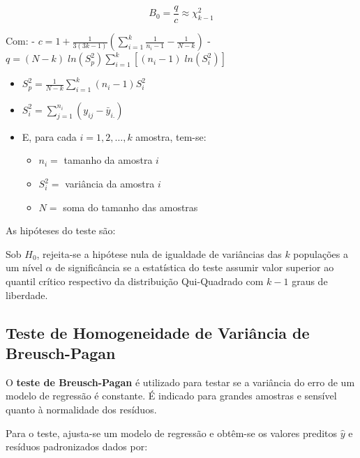 \documentclass[
]{estat/estat}
\providecommand{\tightlist}{%
  \setlength{\itemsep}{0pt}\setlength{\parskip}{0pt}}\usepackage{longtable,booktabs,array}
\begin{document}
\[ B_0 = \frac{q}{c} \approx \chi^2_{k-1} \]

Com: -
\(\displaystyle c = 1 + \frac{1}{3(3k-1)}\left(\sum_{i=1}^{k} \frac{1}{n_i - 1} - \frac{1}{N - k}\right)\)
-
\(\displaystyle q = (N - k) \; ln \left( S^2_p \right) \sum_{i=1}^{k} \left[(n_i - 1) \; ln \left( S^2_i \right) \right]\)

\begin{itemize}
\item
  \(\displaystyle S^2_p = \frac{1}{N - k}\sum_{i=1}^{k}(n_i - 1)S^2_i\)
\item
  \(\displaystyle S^2_i = \sum_{j=1}^{n_i}(y_{ij} - \bar{y}_{i.})\)
\item
  E, para cada \(i=1, 2, \ldots, k\) amostra, tem-se:

  \begin{itemize}
  \tightlist
  \item
    \(n_i =\) tamanho da amostra \(i\)
  \item
    \(S^2_i =\) variância da amostra \(i\)
  \item
    \(N =\) soma do tamanho das amostras
  \end{itemize}
\end{itemize}

As hipóteses do teste são:


Sob \(H_0\), rejeita-se a hipótese nula de igualdade de variâncias das
\(k\) populações a um nível \(\alpha\) de significância se a estatística
do teste assumir valor superior ao quantil crítico respectivo da
distribuição Qui-Quadrado com \(k-1\) graus de liberdade.

\hypertarget{teste-de-homogeneidade-de-variuxe2ncia-de-breusch-pagan}{%
\subsection{Teste de Homogeneidade de Variância de
Breusch-Pagan}\label{teste-de-homogeneidade-de-variuxe2ncia-de-breusch-pagan}}

O \textbf{teste de Breusch-Pagan} é utilizado para testar se a variância
do erro de um modelo de regressão é constante. É indicado para grandes
amostras e sensível quanto à normalidade dos resíduos.

Para o teste, ajusta-se um modelo de regressão e obtêm-se os valores
preditos \(\hat{y}\) e resíduos padronizados dados por:
\end{document}

